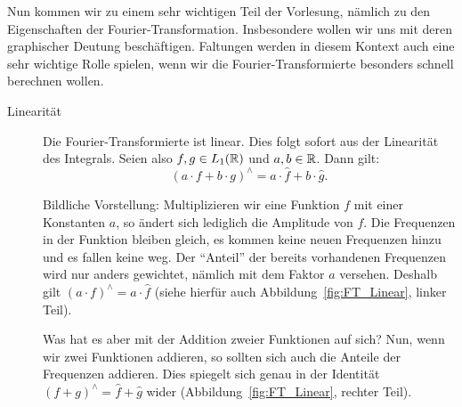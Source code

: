 Nun kommen wir zu einem sehr wichtigen Teil der Vorlesung, nämlich zu den Eigenschaften der
Fourier-Transformation. Insbesondere wollen wir uns mit deren graphischer Deutung beschäftigen.
Faltungen werden in diesem Kontext auch eine sehr wichtige Rolle spielen, wenn wir die
Fourier-Transformierte besonders schnell berechnen wollen.

\begin{remark} \leavevmode
	\begin{description}
  	\item [Linearität] Die Fourier-Transformierte ist linear. Dies folgt sofort aus der Linearität 
  	des Integrals. Seien also $ f, g \in L_{1}(\mathbb{R}) $ und $ a, b \in \mathbb{R} $. Dann gilt:
    	\[
      	(a \cdot f + b \cdot g)^{\wedge} = a \cdot \widehat{f} + b \cdot \widehat{g}.
    	\]
    
    Bildliche Vorstellung: Multiplizieren wir eine Funktion $ f $ mit einer Konstanten $ a $, so
    ändert sich lediglich die Amplitude von $ f $. Die Frequenzen in der Funktion bleiben gleich,
    es kommen keine neuen Frequenzen hinzu und es fallen keine weg. Der \enquote{Anteil} der bereits
    vorhandenen Frequenzen wird nur anders gewichtet, nämlich mit dem Faktor $ a $ versehen. 
    Deshalb gilt $ (a \cdot f)^{\wedge} = a \cdot \widehat{f} $ (siehe hierfür auch 
    Abbildung~\ref{fig:FT_Linear}, linker Teil).
    
    Was hat es aber mit der Addition zweier Funktionen auf sich? Nun, wenn wir zwei Funktionen 
    addieren, so sollten sich auch die Anteile der Frequenzen addieren. Dies spiegelt sich genau in 
    der Identität $ (f + g)^{\wedge} = \widehat{f} + \widehat{g} $ wider 
    (Abbildung~\ref{fig:FT_Linear}, rechter Teil).
    

\end{description}
\end{remark}
